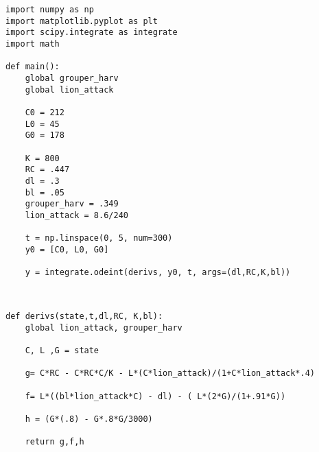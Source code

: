\documentclass[11pt]{article}
\begin{document}
\begin{lstlisting}
import numpy as np
import matplotlib.pyplot as plt
import scipy.integrate as integrate
import math

def main():
    global grouper_harv
    global lion_attack
 
    C0 = 212
    L0 = 45
    G0 = 178
    
    K = 800
    RC = .447
    dl = .3 
    bl = .05
    grouper_harv = .349
    lion_attack = 8.6/240

    t = np.linspace(0, 5, num=300)
    y0 = [C0, L0, G0]  
  
    y = integrate.odeint(derivs, y0, t, args=(dl,RC,K,bl))
    
\end{lstlisting}
     
\begin{lstlisting}

def derivs(state,t,dl,RC, K,bl):
    global lion_attack, grouper_harv

    C, L ,G = state   
    
    g= C*RC - C*RC*C/K - L*(C*lion_attack)/(1+C*lion_attack*.4)
   
    f= L*((bl*lion_attack*C) - dl) - ( L*(2*G)/(1+.91*G))
    
    h = (G*(.8) - G*.8*G/3000)

    return g,f,h
    
\end{lstlisting}
\end{document}
